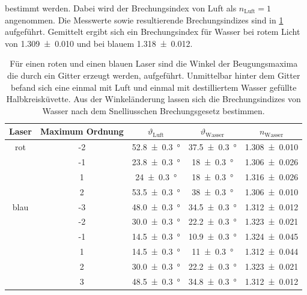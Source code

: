 \documentclass[
	a4paper,
	12pt,
	pagesize,
	ngerman
]{scrartcl}
\begin{document}
	bestimmt werden.
	Dabei wird der Brechungsindex von Luft als $n_\text{Luft} = 1$ angenommen. %
	Die Messwerte sowie resultierende Brechungsindizes sind in \cref{tab_wasser} aufgeführt.
	Gemittelt ergibt sich ein Brechungsindex für Wasser bei rotem Licht von \SI{1,309 +- 0,010}{} und bei blauem \SI{1,318 +- 0,012}{}.
	\begin{table}[H]
		\centering
		\begin{tabular}{ c | c | c | c | c}
			Laser & Maximum Ordnung & $\vartheta_\text{Luft}$ & $\vartheta_\text{Wasser}$ & $n_\text{Wasser}$ \\ \hline
			rot & -2 &\SI{52,8 +- 0,3}{\degree} & \SI{37,5 +-0,3}{\degree} & \SI{1,308 +- 0,010}{}\\
			& -1 &\SI{23,8 +- 0,3}{\degree} & \SI{18+-0,3}{\degree} & \SI{1,306 +- 0,026}{}\\
			& 1 &\SI{24 +- 0,3}{\degree} & \SI{18+-0,3}{\degree} & \SI{1,316 +- 0,026}{}\\
			& 2 &\SI{53,5 +- 0,3}{\degree} & \SI{38+-0,3}{\degree} & \SI{1,306 +- 0,010}{}\\ \hline
			blau & -3 & \SI{48,0 +- 0,3}{\degree}&\SI{34,5+-0,3}{\degree}& \SI{1,312 +- 0,012}{} \\
			& -2 & \SI{30,0 +- 0,3}{\degree}&\SI{22,2+-0,3}{\degree}& \SI{1,323 +- 0,021}{} \\
			& -1 & \SI{14,5 +- 0,3}{\degree}&\SI{10,9+-0,3}{\degree}& \SI{1,324 +- 0,045}{} \\
			& 1 & \SI{14,5 +- 0,3}{\degree}&\SI{11+-0,3}{\degree}& \SI{1,312 +- 0,044}{} \\
			& 2 & \SI{30,0 +- 0,3}{\degree}&\SI{22,2+-0,3}{\degree}& \SI{1,323 +- 0,021}{} \\
			& 3 & \SI{48,5 +- 0,3}{\degree}&\SI{34,8+-0,3}{\degree}& \SI{1,312 +- 0,012}{} \\

		\end{tabular}
		\caption{Für einen roten und einen blauen Laser sind die Winkel der Beugungsmaxima die durch ein Gitter erzeugt werden, aufgeführt. Unmittelbar hinter dem Gitter befand sich eine einmal mit Luft und einmal mit destilliertem Wasser gefüllte Halbkreisküvette. Aus der Winkeländerung lassen sich die Brechungsindizes von Wasser nach dem Snelliusschen Brechungsgesetz bestimmen.} 
		\label{tab_wasser}
	\end{table}
	
\end{document}
